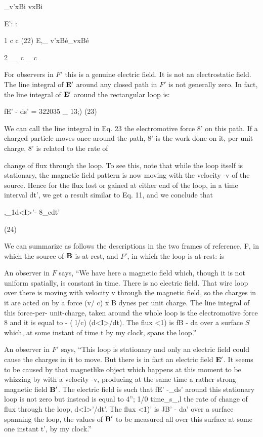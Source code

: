 \begin{equation}
\end{equation}
_v'xBi vxBi

E': :

1 c c (22)
E,_ v'xBé_vxBé

2__ c _ c

For observers in $F'$ this is a genuine electric field. It is not an
electrostatic field. The line integral of $\mathbf{E}'$ around any closed path in
$F'$ is not generally zero. In fact, the line integral of $\mathbf{E}'$ around the
rectangular loop is:

\begin{equation}
\end{equation}
fE' - ds' = 322035 _ 13;) (23)

We can call the line integral in Eq. 23 the electromotive force 8' on
this path. If a charged particle moves once around the path, 8' is
the work done on it, per unit charge. 8' is related to the rate of

change of flux through the loop. To see this, note that while the loop
itself is stationary, the magnetic field pattern is now moving with the
velocity -v of the source. Hence for the flux lost or gained at either
end of the loop, in a time interval dt', we get a result similar to Eq. 11,
and we conclude that

\begin{equation}
\end{equation}
,_1d<I>'-
8_cdt'

(24)

We can summarize as follows the descriptions in the two frames of
reference, F, in which the source of $\mathbf{B}$ is at rest, and $F'$, in which the
loop is at rest: is

An observer in $F$ says, ``We have here a magnetic field which,
though it is not uniform spatially, is constant in time. There is no
electric field. That wire loop over there is moving with velocity v
through the magnetic field, so the charges in it are acted on by a force
(v/ c) x B dynes per unit charge. The line integral of this force-per-
unit-charge, taken around the whole loop is the electromotive force 8
and it is equal to - ( l/c) (d<I>/dt). The flux <1) is fB - da over a surface
$S$ which, at some instant of time t by my clock, spans the loop.''

An observer in $F'$ says, ``This loop is stationary and only an electric
field could cause the charges in it to move. But there is in fact an
electric field $\mathbf{E}'$. It seems to be caused by that magnetlike object
which happens at this moment to be whizzing by with a velocity -v,
producing at the same time a rather strong magnetic field $\mathbf{B}'$. The
electric field is such that fE' -_ds' around this stationary loop is not
zero but instead is equal to 4''; 1/0 time_s_,l the rate of change of flux
through the loop, d<I>'/dt'. The flux <1)' is JB' - da' over a surface
spanning the loop, the values of $\mathbf{B}'$ to be measured all over this surface
at some one instant t', by my clock.''

